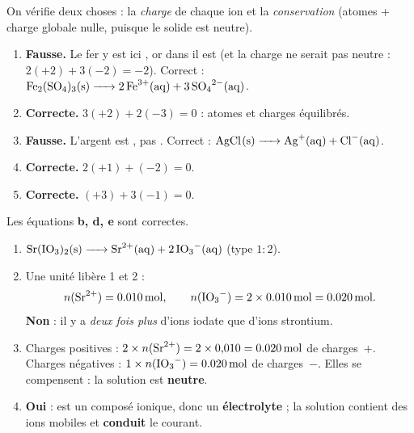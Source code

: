 \documentclass[11pt,a4paper]{article}
\begin{document}
\begin{corrige}
On vérifie deux choses : la \emph{charge} de chaque ion et la \emph{conservation} (atomes + charge
globale nulle, puisque le solide est neutre).
\begin{enumerate}[label=\alph*)]
  \item \textbf{Fausse.} Le fer y est ici , or dans  il est 
        (et la charge ne serait pas neutre : $2(+2)+3(-2)=-2$). Correct :
        $\ce{Fe2(SO4)3(s) -> 2 Fe^{3+}(aq) + 3 SO4^{2-}(aq)}$.
  \item \textbf{Correcte.} $3(+2)+2(-3)=0$ : atomes et charges équilibrés.
  \item \textbf{Fausse.} L'argent est , pas . Correct :
        $\ce{AgCl(s) -> Ag^{+}(aq) + Cl^{-}(aq)}$.
  \item \textbf{Correcte.} $2(+1)+(-2)=0$.
  \item \textbf{Correcte.} $(+3)+3(-1)=0$.
\end{enumerate}
Les équations \textbf{b, d, e} sont correctes.
\end{corrige}

\begin{corrige}
\begin{enumerate}[label=\alph*)]
  \item $\ce{Sr(IO3)2(s) -> Sr^{2+}(aq) + 2 IO3^{-}(aq)}$ (type $1{:}2$).
  \item Une unité libère 1  et 2  :
        \[ n(\ce{Sr^{2+}}) = \qty{0.010}{\mole}, \qquad n(\ce{IO3-}) = 2\times\qty{0.010}{\mole}=\qty{0.020}{\mole}. \]
        \textbf{Non} : il y a \emph{deux fois plus} d'ions iodate que d'ions strontium.
  \item Charges positives : $2\times n(\ce{Sr^{2+}}) = 2\times 0{,}010 = \qty{0.020}{\mole}$ de charges~$+$.
        Charges négatives : $1\times n(\ce{IO3-}) = \qty{0.020}{\mole}$ de charges~$-$. Elles se
        compensent : la solution est \textbf{neutre}.
  \item \textbf{Oui} :  est un composé ionique, donc un \textbf{électrolyte} ; la solution
        contient des ions mobiles et \textbf{conduit} le courant.
\end{enumerate}
\end{corrige}
\end{document}
